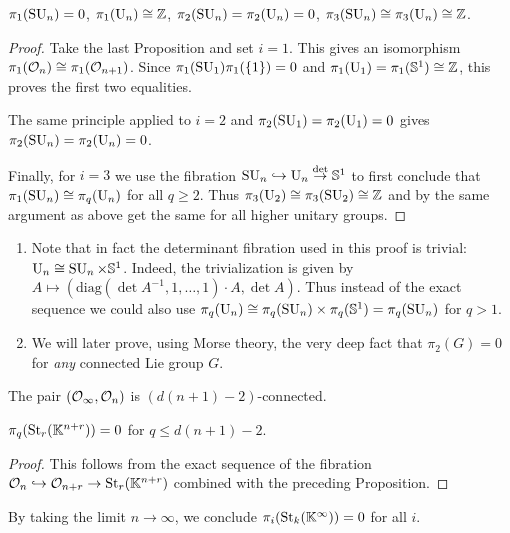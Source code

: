 \begin{cor}
    $\pi_1(\operatorname{SU}_n)=0$, $\pi_1(\operatorname{U}_n)\cong \mathbb{Z}$, $\pi_2(\operatorname{SU}_n)=\pi_2(\operatorname{U}_n)=0$, $\pi_3(\operatorname{SU}_n)\cong \pi_3(\operatorname{U}_n)\cong\mathbb{Z}$.
\end{cor}
\begin{proof}
    Take the last Proposition and set $i=1$. This gives an isomorphism $\pi_1(\mathcal{O}_n)\cong \pi_1(\mathcal{O}_{n+1})$. Since $\pi_1(\operatorname{SU}_1)\pi_1(\{1\})=0$ and $\pi_1(\operatorname{U}_1)=\pi_1(\mathbb{S}^1)\cong\mathbb{Z}$, this proves the first two equalities. 

    The same principle applied to $i=2$ and $\pi_2(\operatorname{SU}_1)=\pi_2(\operatorname{U}_1)=0$ gives $\pi_2(\operatorname{SU}_n)=\pi_2(\operatorname{U}_n)=0$.

    Finally, for $i=3$ we use the fibration $\operatorname{SU}_n\hookrightarrow \operatorname{U}_n\overset{\det}{\to} \mathbb{S}^1$ to first conclude that $\pi_1(\operatorname{SU}_n)\cong \pi_q(\operatorname{U}_n)$ for all $q\geq 2$. Thus $\pi_3(\operatorname{U}_2)\cong \pi_3(\operatorname{SU}_2)\cong\mathbb{Z}$ and by the same argument as above get the same for all higher unitary groups.
\end{proof}
\begin{rem}
\begin{enumerate}
    \item Note that in fact the determinant fibration used in this proof is trivial: $\operatorname{U}_n\cong \operatorname{SU}_n\times \mathbb{S}^1$. Indeed, the trivialization is given by $A\mapsto (\mathrm{diag}(\det A^{-1},1,\ldots,1)\cdot A,\det A)$. Thus instead of the exact sequence we could also use $\pi_q(\operatorname{U}_n)\cong\pi_q(\operatorname{SU}_n)\times \pi_q(\mathbb{S}^1)=\pi_q(\operatorname{SU}_n)$ for $q>1$.
    \item We will later prove, using Morse theory, the very deep fact that $\pi_2(G)=0$ for \emph{any} connected Lie group $G$.
\end{enumerate}
\end{rem}



\begin{cor}
    The pair $(\mathcal{O}_\infty,\mathcal{O}_n)$ is $(d(n+1)-2)$-connected.
\end{cor}

\begin{cor}
    $\pi_q(\operatorname{St}_r(\mathbb{K}^{n+r}))=0$ for $q\leq d(n+1)-2$.
\end{cor}
\begin{proof}
    This follows from the exact sequence of the fibration $\mathcal{O}_n\hookrightarrow \mathcal{O}_{n+r}\to \operatorname{St}_{r}(\mathbb{K}^{n+r})$ combined with the preceding Proposition.
\end{proof}
\begin{cor}
    By taking the limit $n\to\infty$, we conclude $\pi_i(\operatorname{St}_k(\mathbb{K}^\infty))=0$ for all $i$.
\end{cor}


